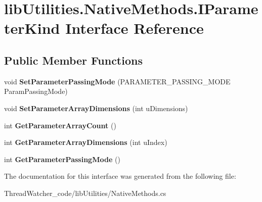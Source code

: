 \hypertarget{interfacelib_utilities_1_1_native_methods_1_1_i_parameter_kind}{\section{lib\+Utilities.\+Native\+Methods.\+I\+Parameter\+Kind Interface Reference}
\label{interfacelib_utilities_1_1_native_methods_1_1_i_parameter_kind}
}
\subsection*{Public Member Functions}
\begin{DoxyCompactItemize}
\item 
\hypertarget{interfacelib_utilities_1_1_native_methods_1_1_i_parameter_kind_a004f9cc40114b8e3ee4bd4773ad8aea5}{void {\bfseries Set\+Parameter\+Passing\+Mode} (P\+A\+R\+A\+M\+E\+T\+E\+R\+\_\+\+P\+A\+S\+S\+I\+N\+G\+\_\+\+M\+O\+D\+E Param\+Passing\+Mode)}\label{interfacelib_utilities_1_1_native_methods_1_1_i_parameter_kind_a004f9cc40114b8e3ee4bd4773ad8aea5}

\item 
\hypertarget{interfacelib_utilities_1_1_native_methods_1_1_i_parameter_kind_af583408f3c02768eac9d6c8b3c946804}{void {\bfseries Set\+Parameter\+Array\+Dimensions} (int u\+Dimensions)}\label{interfacelib_utilities_1_1_native_methods_1_1_i_parameter_kind_af583408f3c02768eac9d6c8b3c946804}

\item 
\hypertarget{interfacelib_utilities_1_1_native_methods_1_1_i_parameter_kind_aee15409a0b84ffe998bd01f1edc5d1f8}{int {\bfseries Get\+Parameter\+Array\+Count} ()}\label{interfacelib_utilities_1_1_native_methods_1_1_i_parameter_kind_aee15409a0b84ffe998bd01f1edc5d1f8}

\item 
\hypertarget{interfacelib_utilities_1_1_native_methods_1_1_i_parameter_kind_a2fa966b639e4f2c7a7e16e1849709bf6}{int {\bfseries Get\+Parameter\+Array\+Dimensions} (int u\+Index)}\label{interfacelib_utilities_1_1_native_methods_1_1_i_parameter_kind_a2fa966b639e4f2c7a7e16e1849709bf6}

\item 
\hypertarget{interfacelib_utilities_1_1_native_methods_1_1_i_parameter_kind_ade49fdc02ccbe842ff404267f505ee9a}{int {\bfseries Get\+Parameter\+Passing\+Mode} ()}\label{interfacelib_utilities_1_1_native_methods_1_1_i_parameter_kind_ade49fdc02ccbe842ff404267f505ee9a}

\end{DoxyCompactItemize}


The documentation for this interface was generated from the following file\+:\begin{DoxyCompactItemize}
\item 
Thread\+Watcher\+\_\+code/lib\+Utilities/Native\+Methods.\+cs\end{DoxyCompactItemize}
